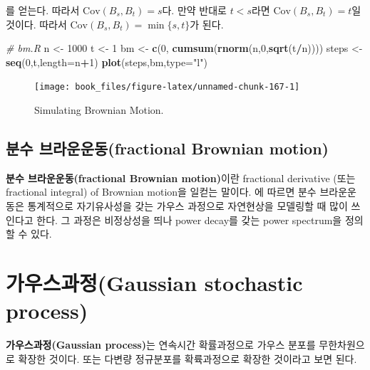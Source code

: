 \documentclass[b5paper,]{scrbook}
\makeatletter
\newenvironment{Shaded}{\begin{snugshade}}{\end{snugshade}}
\newcommand{\CommentTok}[1]{\textcolor[rgb]{0.56,0.35,0.01}{\textit{#1}}}
\newcommand{\DataTypeTok}[1]{\textcolor[rgb]{0.13,0.29,0.53}{#1}}
\newcommand{\DecValTok}[1]{\textcolor[rgb]{0.00,0.00,0.81}{#1}}
\newcommand{\KeywordTok}[1]{\textcolor[rgb]{0.13,0.29,0.53}{\textbf{#1}}}
\newcommand{\NormalTok}[1]{#1}
\newcommand{\OperatorTok}[1]{\textcolor[rgb]{0.81,0.36,0.00}{\textbf{#1}}}
\newcommand{\StringTok}[1]{\textcolor[rgb]{0.31,0.60,0.02}{#1}}
\theoremstyle{plain}
\theoremstyle{definition}
\numberwithin{equation}{section}
\newenvironment{kframe}{%
\medskip{}
\setlength{\fboxsep}{.8em}
 \def\at@end@of@kframe{}%
 \ifinner\ifhmode%
  \def\at@end@of@kframe{\end{minipage}}%
  \begin{minipage}{\columnwidth}%
 \fi\fi%
 \def\FrameCommand##1{\hskip\@totalleftmargin \hskip-\fboxsep
 \colorbox{shadecolor}{##1}\hskip-\fboxsep
     \hskip-\linewidth \hskip-\@totalleftmargin \hskip\columnwidth}%
 \MakeFramed {\advance\hsize-\width
   \@totalleftmargin\z@ \linewidth\hsize
   \@setminipage}}%
 {\par\unskip\endMakeFramed%
 \at@end@of@kframe}
\renewenvironment{Shaded}{\begin{kframe}}{\end{kframe}}
\makeatother
\begin{document}
를 얻는다. 따라서 \(\text{Cov}(B_{s},B_{t})=s\)다. 만약 반대로 \(t<s\)라면 \(\text{Cov}(B_{s},B_{t})=t\)일 것이다. 따라서 \(\text{Cov}(B_{s} ,B_{t})=\min\{s,t\}\)가 된다.

\begin{Shaded}
\begin{Highlighting}[]
\CommentTok{# bm.R}
\NormalTok{n <-}\StringTok{ }\DecValTok{1000}
\NormalTok{t <-}\StringTok{ }\DecValTok{1}
\NormalTok{bm <-}\StringTok{ }\KeywordTok{c}\NormalTok{(}\DecValTok{0}\NormalTok{, }\KeywordTok{cumsum}\NormalTok{(}\KeywordTok{rnorm}\NormalTok{(n,}\DecValTok{0}\NormalTok{,}\KeywordTok{sqrt}\NormalTok{(t}\OperatorTok{/}\NormalTok{n))))}
\NormalTok{steps <-}\StringTok{ }\KeywordTok{seq}\NormalTok{(}\DecValTok{0}\NormalTok{,t,}\DataTypeTok{length=}\NormalTok{n}\OperatorTok{+}\DecValTok{1}\NormalTok{)}
\KeywordTok{plot}\NormalTok{(steps,bm,}\DataTypeTok{type=}\StringTok{"l"}\NormalTok{)}
\end{Highlighting}
\end{Shaded}

\begin{figure}

{\centering \texttt{[image: book\_files/figure-latex/unnamed-chunk-167-1]} 

}

\caption{Simulating Brownian Motion.}\label{fig:unnamed-chunk-167}
\end{figure}

\hypertarget{-fractional-brownian-motion}{%
\subsection{분수 브라운운동(fractional Brownian motion)}\label{-fractional-brownian-motion}}

\textbf{분수 브라운운동(fractional Brownian motion)}이란 fractional derivative (또는 fractional integral) of Brownian motion을 일컫는 말이다. \citep{Mallat2008}에 따르면 분수 브라운운동은 통계적으로 자기유사성을 갖는 가우스 과정으로 자연현상을 모델링할 때 많이 쓰인다고 한다. 그 과정은 비정상성을 띄나 power decay를 갖는 power spectrum을 정의할 수 있다.

\hypertarget{gaussian-stochastic-process}{%
\section{가우스과정(Gaussian stochastic process)}\label{gaussian-stochastic-process}}

\textbf{가우스과정(Gaussian process)}는 연속시간 확률과정으로 가우스 분포를 무한차원으로 확장한 것이다. 또는 다변량 정규분포를 확륙과정으로 확장한 것이라고 보면 된다.
\end{document}
